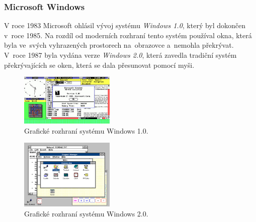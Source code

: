 \documentclass[11pt,twoside,a4paper]{book}
\begin{document}
\subsubsection{Microsoft Windows}
V roce 1983 Microsoft ohlásil vývoj systému \textit{Windows 1.0}, který byl dokončen v~roce 1985. Na rozdíl od moderních rozhraní tento systém používal okna, která byla ve~svých vyhrazených prostorech na~obrazovce a~nemohla překrývat. V~roce 1987 byla vydána verze \textit{Windows 2.0}, která zavedla tradiční systém překrývajících se oken, která se dala přesunovat pomocí myši.
\begin{figure}[!ht]
\begin{center}
  \includegraphics[width=0.4\textwidth]{win1}
\caption{{\label{fig:win1GUI}}Grafické rozhraní systému Windows 1.0.\cite{bib:winImage}}
\end{center}
\end{figure}
\begin{figure}[!ht]
\begin{center}
  \includegraphics[width=0.4\textwidth]{win2}
\caption{{\label{fig:win2GUI}}Grafické rozhraní systému Windows 2.0.\cite{bib:winImage}}
\end{center}
\end{figure}
\end{document}
